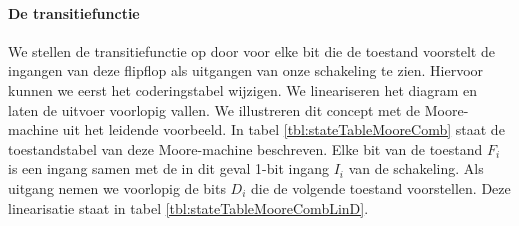 \paragraph{De transitiefunctie}We stellen de transitiefunctie op door voor elke bit die de toestand voorstelt de ingangen van deze flipflop als uitgangen van onze schakeling te zien. Hiervoor kunnen we eerst het coderingstabel wijzigen. We lineariseren het diagram en laten de uitvoer voorlopig vallen. We illustreren dit concept met de Moore-machine uit het leidende voorbeeld. In tabel \ref{tbl:stateTableMooreComb} staat de toestandstabel van deze Moore-machine beschreven. Elke bit van de toestand $F_i$ is een ingang samen met de in dit geval 1-bit ingang $I_i$ van de schakeling. Als uitgang nemen we voorlopig de bits $D_i$ die de volgende toestand voorstellen. Deze linearisatie staat in tabel \ref{tbl:stateTableMooreCombLinD}.
